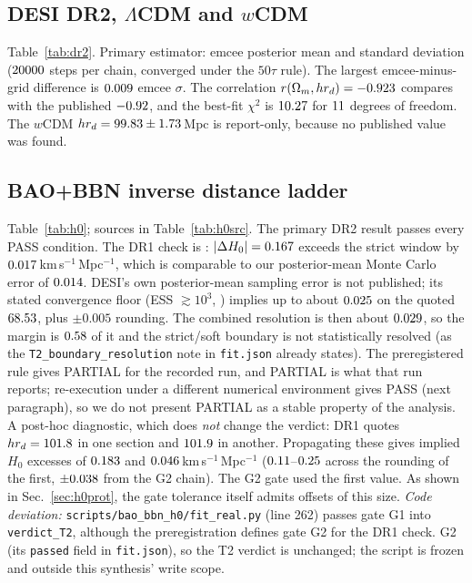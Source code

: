 \documentclass[11pt]{article}
\newcommand{\kms}{km\,s$^{-1}$\,Mpc$^{-1}$}
\begin{document}
\subsection{DESI DR2, $\Lambda$CDM and $w$CDM}
Table~\ref{tab:dr2}. Primary estimator: emcee posterior mean and standard deviation ($20000$ steps per chain, converged under
the $50\tau$ rule). The largest emcee-minus-grid difference is $0.009$ emcee $\sigma$. The correlation
$r(\Omega_m, hr_d)=-0.923$ compares with the published $-0.92$, and the best-fit $\chi^2$ is $10.27$ for $11$ degrees of
freedom. The $w$CDM $hr_d=99.83\pm1.73$\,Mpc is report-only, because no published value was found.
\begin{table}[h]\centering\small\caption{DESI DR2 BAO only (\texttt{results/desi\_dr2\_bao/fit.json}).}\label{tab:dr2}
\resizebox{\textwidth}{!}{}\end{table}

\subsection{BAO+BBN inverse distance ladder}
Table~\ref{tab:h0}; sources in Table~\ref{tab:h0src}. The primary DR2 result passes every PASS condition. The DR1 check is
\hzPTwoV: $|\Delta H_0|=0.167$ exceeds the strict window by $0.017$\,\kms, which is comparable to our posterior-mean Monte
Carlo error of $0.014$. DESI's own posterior-mean sampling error is not published; its stated convergence floor (ESS $\gtrsim10^3$, \cite[Sec.~2.5]{desi2024vi})
implies up to about $0.025$ on the quoted $68.53$, plus $\pm0.005$ rounding. The combined resolution is then about $0.029$, so the margin is $0.58$ of it and
the strict/soft boundary is not statistically resolved (as the \texttt{T2\_boundary\_resolution} note in \texttt{fit.json} already states). The preregistered rule gives
PARTIAL for the recorded run, and PARTIAL is what that run reports; re-execution under a different numerical environment gives PASS (next paragraph), so we do
not present PARTIAL as a stable property of the analysis. A post-hoc diagnostic, which does
\emph{not} change the verdict: DR1 quotes $hr_d=101.8$ in one section and $101.9$ in another. Propagating these gives implied $H_0$
excesses of $0.183$ and $0.046$\,\kms{} ($0.11$--$0.25$ across the rounding of the first, $\pm0.038$ from the G2 chain). The G2 gate used the first value. As shown in Sec.~\ref{sec:h0prot}, the gate tolerance itself admits
offsets of this size. \emph{Code deviation:} \texttt{scripts/bao\_bbn\_h0/fit\_real.py} (line 262) passes gate G1 into \texttt{verdict\_T2}, although the
preregistration defines gate G2 for the DR1 check. G2 \rgGTwoPassed{} (its \texttt{passed} field in \texttt{fit.json}), so the T2 verdict is unchanged;
the script is frozen and outside this synthesis' write scope.
\end{document}
